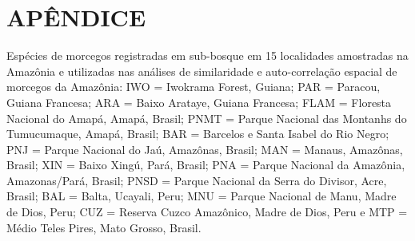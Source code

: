 \section*{APÊNDICE}
\par{}Espécies de morcegos registradas em sub-bosque em 15 localidades amostradas na Amazônia e utilizadas nas análises de similaridade e auto-correlação espacial de morcegos da Amazônia: IWO = Iwokrama Forest, Guiana; PAR = Paracou, Guiana Francesa; ARA = Baixo Arataye, Guiana Francesa; FLAM = Floresta Nacional do Amapá, Amapá, Brasil; PNMT = Parque Nacional das Montanhs do Tumucumaque, Amapá, Brasil; BAR = Barcelos e Santa Isabel do Rio Negro; PNJ = Parque Nacional do Jaú, Amazônas, Brasil; MAN = Manaus, Amazônas, Brasil; XIN = Baixo Xingú, Pará, Brasil; PNA = Parque Nacional da Amazônia, Amazonas/Pará, Brasil; PNSD = Parque Nacional da Serra do Divisor, Acre, Brasil; BAL = Balta, Ucayali, Peru; MNU = Parque Nacional de Manu, Madre de Dios, Peru; CUZ = Reserva Cuzco Amazônico, Madre de Dios, Peru e MTP = Médio Teles Pires, Mato Grosso, Brasil.

